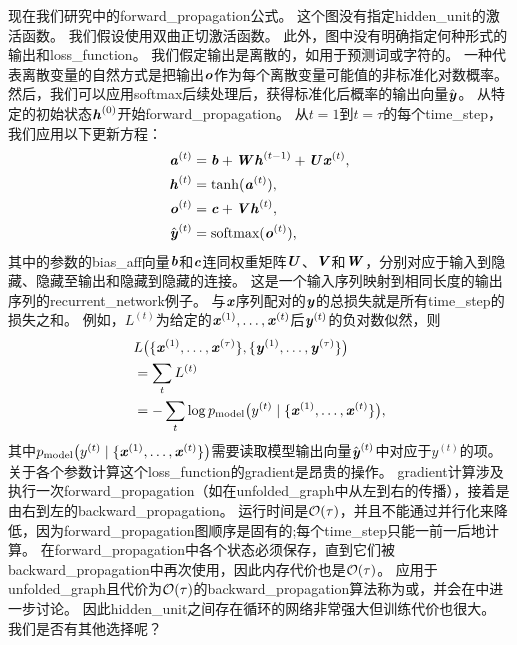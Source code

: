 现在我们研究中的\gls{forward_propagation}公式。
这个图没有指定\gls{hidden_unit}的激活函数。
我们假设使用双曲正切激活函数。
此外，图中没有明确指定何种形式的输出和\gls{loss_function}。
我们假定输出是离散的，如用于预测词或字符的。
一种代表离散变量的自然方式是把输出$\boldsymbol{\mathit{o}}$作为每个离散变量可能值的非标准化对数概率。
然后，我们可以应用\gls{softmax}后续处理后，获得标准化后概率的输出向量$\hat {\boldsymbol{\mathit{y}}}$。
从特定的初始状态$\boldsymbol{\mathit{h}}^{(0)}$开始\gls{forward_propagation}。
从$t= 1$到$t = \tau$的每个\gls{time_step}，我们应用以下更新方程：
\begin{align}
\label{eq:108a}
 \boldsymbol{\mathit{a}}^{(t)} &= \boldsymbol{\mathit{b}} + \boldsymbol{\mathit{W}} \boldsymbol{\mathit{h}}^{(t-1)} + \boldsymbol{\mathit{U}} \boldsymbol{\mathit{x}}^{(t)}, \\
  \boldsymbol{\mathit{h}}^{(t)} &= \tanh(\boldsymbol{\mathit{a}}^{(t)} ), \\
  \boldsymbol{\mathit{o}}^{(t)} &= \boldsymbol{\mathit{c}} + \boldsymbol{\mathit{V}} \boldsymbol{\mathit{h}}^{(t)}, \\
  \hat {\boldsymbol{\mathit{y}}}^{(t)} &= \text{softmax}(\boldsymbol{\mathit{o}}^{(t)}),
\end{align}
其中的参数的\gls{bias_aff}向量$\boldsymbol{\mathit{b}}$和$\boldsymbol{\mathit{c}}$连同权重矩阵$\boldsymbol{\mathit{U}}$、$\boldsymbol{\mathit{V}}$和$\boldsymbol{\mathit{W}}$，分别对应于输入到隐藏、隐藏至输出和隐藏到隐藏的连接。
这是一个输入序列映射到相同长度的输出序列的\gls{recurrent_network}例子。
与$\boldsymbol{\mathit{x}}$序列配对的$\boldsymbol{\mathit{y}}$的总损失就是所有\gls{time_step}的损失之和。
例如，$L^{(t)}$为给定的$\boldsymbol{\mathit{x}}^{(1)}, \dots, \boldsymbol{\mathit{x}}^{(t)}$后$\boldsymbol{\mathit{y}}^{(t)}$的负对数似然，则
\begin{align} \label{eq:1012L}
 & L\big( \{ \boldsymbol{\mathit{x}}^{(1)}, \dots, \boldsymbol{\mathit{x}}^{(\tau)} \}, \{ \boldsymbol{\mathit{y}}^{(1)}, \dots, \boldsymbol{\mathit{y}}^{(\tau)}  \} \big) \\
 & = \sum_t L^{(t)} \\
 & = - \sum_t \log p_{\text{model}} \big(  y^{(t)} \mid  \{ \boldsymbol{\mathit{x}}^{(1)}, \dots, \boldsymbol{\mathit{x}}^{(t)} \} \big) ,
\end{align}
其中$p_{\text{model}} \big(  y^{(t)} \mid  \{ \boldsymbol{\mathit{x}}^{(1)}, \dots, \boldsymbol{\mathit{x}}^{(t)} \} \big) $需要读取模型输出向量$\hat {\boldsymbol{\mathit{y}}}^{(t)}$中对应于$y^{(t)}$的项。
关于各个参数计算这个\gls{loss_function}的\gls{gradient}是昂贵的操作。
\gls{gradient}计算涉及执行一次\gls{forward_propagation}（如在\gls{unfolded_graph}中从左到右的传播），接着是由右到左的\gls{backward_propagation}。
运行时间是$\mathcal{O}(\tau)$，并且不能通过并行化来降低，因为\gls{forward_propagation}图顺序是固有的;每个\gls{time_step}只能一前一后地计算。
在\gls{forward_propagation}中各个状态必须保存，直到它们被\gls{backward_propagation}中再次使用，因此内存代价也是$\mathcal{O}(\tau)$。
应用于\gls{unfolded_graph}且代价为$\mathcal{O}(\tau)$的\gls{backward_propagation}算法称为或，并会在中进一步讨论。
因此\gls{hidden_unit}之间存在循环的网络非常强大但训练代价也很大。
我们是否有其他选择呢？

